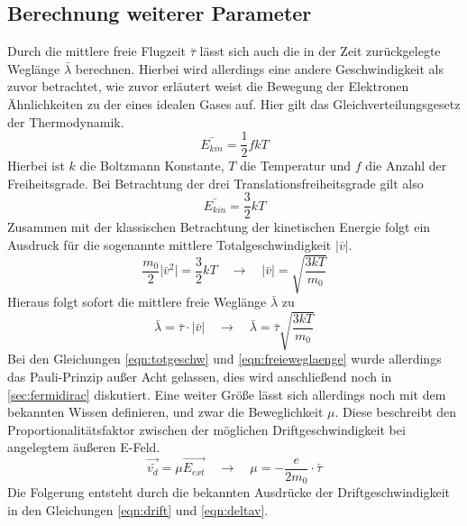 \subsection{Berechnung weiterer Parameter}
Durch die mittlere freie Flugzeit $\bar{\tau}$ lässt sich auch die in der Zeit zurückgelegte Weglänge $\bar{\lambda}$ berechnen. Hierbei wird allerdings 
eine andere Geschwindigkeit als zuvor betrachtet, wie zuvor erläutert weist die Bewegung der Elektronen Ähnlichkeiten zu der eines idealen Gases auf. 
Hier gilt das Gleichverteilungsgesetz der Thermodynamik.
\begin{equation}
\bar{E_{kin}} = \frac{1}{2} f k T
\end{equation}
Hierbei ist $k$ die Boltzmann Konstante, $T$ die Temperatur und $f$ die Anzahl der Freiheitsgrade. Bei Betrachtung der drei Translationsfreiheitsgrade gilt also
\begin{equation}
\bar{E_{kin}} = \frac{3}{2} k T
\end{equation}
Zusammen mit der klassischen Betrachtung der kinetischen Energie folgt ein Ausdruck für die sogenannte mittlere Totalgeschwindigkeit $\lvert \bar{v} \rvert$.
\begin{equation}
\label{eqn:totgeschw}
\frac{m_{0}}{2} \lvert \bar{v}^{2} \rvert = \frac{3}{2} k T \quad \to \quad \lvert \bar{v} \rvert = \sqrt{\frac{3kT}{m_{0}}}
\end{equation}
Hieraus folgt sofort die mittlere freie Weglänge $\bar{\lambda}$ zu
\begin{equation}
\label{eqn:freieweglaenge}
\bar{\lambda} = \bar{\tau} \cdot \lvert \bar{v} \rvert \quad \to \quad \bar{\lambda} = \bar{\tau} \sqrt{\frac{3kT}{m_{0}}}
\end{equation}
Bei den Gleichungen \eqref{eqn:totgeschw} und \eqref{eqn:freieweglaenge} wurde allerdings das Pauli-Prinzip außer Acht gelassen, dies wird anschließend noch in \ref{sec:fermidirac}
diskutiert. Eine weiter Größe lässt sich allerdings noch mit dem bekannten Wissen definieren, und zwar die Beweglichkeit $\mu$. Diese beschreibt den Proportionalitätsfaktor zwischen
der möglichen Driftgeschwindigkeit bei angelegtem äußeren E-Feld.
\begin{equation}
\label{eqn:beweglich}
\vec{\bar{v_{d}}} = \mu \vec{E_{ext}} \quad \to \quad \mu = - \frac{e}{2 m_{0}} \cdot \bar{\tau} 
\end{equation}
Die Folgerung entsteht durch die bekannten Ausdrücke der Driftgeschwindigkeit in den Gleichungen \eqref{eqn:drift} und \eqref{eqn:deltav}.

